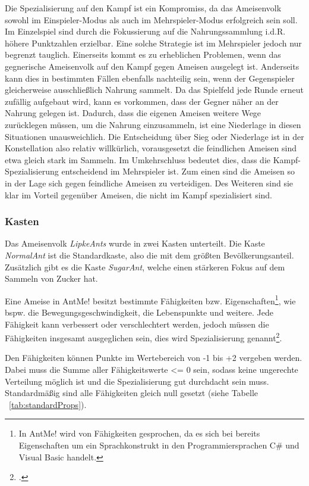 Die Spezialisierung auf den Kampf ist ein Kompromiss, da das Ameisenvolk sowohl im Einspieler-Modus als auch im Mehrspieler-Modus erfolgreich sein soll. Im Einzelspiel sind durch die Fokussierung auf die Nahrungssammlung i.d.R. höhere Punktzahlen erzielbar. Eine solche Strategie ist im Mehrspieler jedoch nur begrenzt tauglich. Einerseits kommt es zu erheblichen Problemen, wenn das gegnerische Ameisenvolk auf den Kampf gegen Ameisen ausgelegt ist. Anderseits kann dies in bestimmten Fällen ebenfalls nachteilig sein, wenn der Gegenspieler gleicherweise ausschließlich Nahrung sammelt. Da das Spielfeld jede Runde erneut zufällig aufgebaut wird, kann es vorkommen, dass der Gegner näher an der Nahrung gelegen ist. Dadurch, dass die eigenen Ameisen weitere Wege zurücklegen müssen, um die Nahrung einzusammeln, ist eine Niederlage in diesen Situationen unausweichlich. Die Entscheidung über Sieg oder Niederlage ist in der Konstellation also relativ willkürlich, vorausgesetzt die feindlichen Ameisen sind etwa gleich stark im Sammeln. Im Umkehrschluss bedeutet dies, dass die Kampf-Spezialisierung entscheidend im Mehrspieler ist. Zum einen sind die Ameisen so in der Lage sich gegen feindliche Ameisen zu verteidigen. Des Weiteren sind sie klar im Vorteil gegenüber Ameisen, die nicht im Kampf spezialisiert sind. 

\subsubsection{Kasten}
Das Ameisenvolk \textit{LipkeAnts} wurde in zwei Kasten unterteilt. Die Kaste \textit{NormalAnt} ist die Standardkaste, also die mit dem größten Bevölkerungsanteil. Zusätzlich gibt es die Kaste \textit{SugarAnt}, welche einen stärkeren Fokus auf dem Sammeln von Zucker hat.


Eine Ameise in AntMe! besitzt bestimmte Fähigkeiten bzw. Eigenschaften\footnote{In AntMe! wird von Fähigkeiten gesprochen, da es sich bei bereits Eigenschaften um ein Sprachkonstrukt in den Programmiersprachen C\# und Visual Basic handelt.}, wie bspw. die Bewegungsgeschwindigkeit, die Lebenspunkte und weitere. Jede Fähigkeit kann verbessert oder verschlechtert werden, jedoch müssen die Fähigkeiten insgesamt ausgeglichen sein, dies wird Spezialisierung genannt\footcite{AntMeWiki1}.

Den Fähigkeiten können Punkte im Wertebereich von -1 bis +2 vergeben werden. Dabei muss die Summe aller Fähigkeitswerte <= 0 sein, sodass keine ungerechte Verteilung möglich ist und die Spezialisierung gut durchdacht sein muss. Standardmäßig sind alle Fähigkeiten gleich null gesetzt (siehe Tabelle ~\ref{tab:standardProps}).

